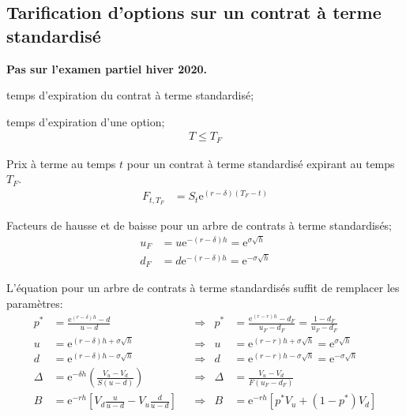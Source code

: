 \documentclass[10pt, french]{article}
\begin{document}
\begin{multicols*}{2}
\subsection*{Tarification d'options sur un contrat à terme standardisé}
\textbf{Pas sur l'examen partiel hiver 2020.}

\begin{distributions}[Notation]
\begin{description}[leftmargin = *]
	\item[$T_{F}$]	temps d'expiration du contrat à terme standardisé;
	\item[$T$]	temps d'expiration d'une option;
		\begin{align*}
		T \le T_{F}
		\end{align*}
	\item[$F_{t, T_{F}}$]	Prix à terme au temps $t$ pour un contrat à terme standardisé expirant au temps $T_{F}$.
		\begin{align*}
		F_{t, T_{F}}
		&=	S_{t} \textrm{e}^{(r - \delta)(T_{F} - t)}
		\end{align*}
	\item[$u_{F}$ et $d_{F}$]	Facteurs de hausse et de baisse pour un arbre de contrats à terme standardisés;
		\begin{align*}
		u_{F}	
		&=	u \textrm{e}^{-(r - \delta)h}	=	\textrm{e}^{\sigma \sqrt{h}}	\\
		d_{F}
		&=	d \textrm{e}^{-(r - \delta)h}	=	\textrm{e}^{-\sigma \sqrt{h}}
		\end{align*}
\end{description}
\end{distributions}

L'équation pour un arbre de contrats à terme standardisés suffit de remplacer les paramètres:
\begin{align*}
	p^{*}	
		&=	\frac{\textrm{e}^{(r - \delta)h} - d}{u - d}	&
	&\Rightarrow	&
	p^{*}	
		&=	\frac{\textrm{e}^{(r -r)h} - d_{F}}{u_{F} - d_{F}}
		=	\frac{1 - d_{F}}{u_{F} - d_{F}}	\\
	u	
		&=	\textrm{e}^{(r - \delta)h + \sigma \sqrt{h}}	&
	&\Rightarrow	&
	u	
		&=	\textrm{e}^{(r - r)h + \sigma \sqrt{h}}	
		=	\textrm{e}^{\sigma \sqrt{h}}	\\
	d	
		&=	\textrm{e}^{(r - \delta)h - \sigma \sqrt{h}}	&
	&\Rightarrow	&
	d	
		&=	\textrm{e}^{(r - r)h - \sigma \sqrt{h}}	
		=	\textrm{e}^{-\sigma \sqrt{h}}	\\
	\Delta
		&=	\textrm{e}^{-\delta h} \left(\frac{V_{u} - V_{d}}{S(u - d)}\right)	&
	&\Rightarrow	&
	\Delta
		&=	\frac{V_{u} - V_{d}}{F(u_{F} - d_{F})}	\\
	B	
		&=	\textrm{e}^{-rh} \left[V_{d} \frac{u}{u - d} - V_{u}\frac{d}{u - d}\right]	&
	&\Rightarrow	&
	B
		&=	\textrm{e}^{-rh} [p^{*} V_{u} + (1 - p^{*}) V_{d}]
\end{align*}


\end{multicols*}
\end{document}
